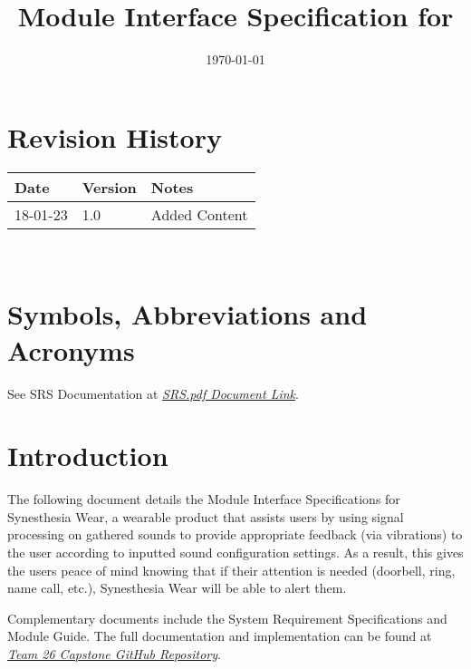 \documentclass[12pt, titlepage]{article}
\begin{document}
\title{Module Interface Specification for \progname{}}

\author{\authname}

\date{\today}

\maketitle


\section*{Revision History}

\begin{tabularx}{\textwidth}{p{3cm}p{2cm}X}
\toprule {\bf Date} & {\bf Version} & {\bf Notes}\\
\midrule
18-01-23 & 1.0 & Added Content\\
\bottomrule
\end{tabularx}

~\newpage

\section*{Symbols, Abbreviations and Acronyms}

See SRS Documentation at  \href{https://github.com/jordanbierbrier/capstone/blob/main/docs/SRS/SRS.pdf}{\textit{SRS.pdf Document Link}}.


\newpage

\tableofcontents

\newpage


\section{Introduction}

The following document details the Module Interface Specifications for Synesthesia Wear, a wearable product that assists users by using signal processing on gathered sounds 
to provide appropriate feedback (via vibrations) to the user according to inputted sound configuration settings. As a result, this gives the users peace of mind knowing that if their attention 
is needed (doorbell, ring, name call, etc.), Synesthesia Wear will be able to alert them.


\noindent Complementary documents include the System Requirement Specifications
and Module Guide.  The full documentation and implementation can be
found at \href{https://github.com/jordanbierbrier/capstone}{\textit{Team 26 Capstone GitHub Repository}}.
\end{document}
